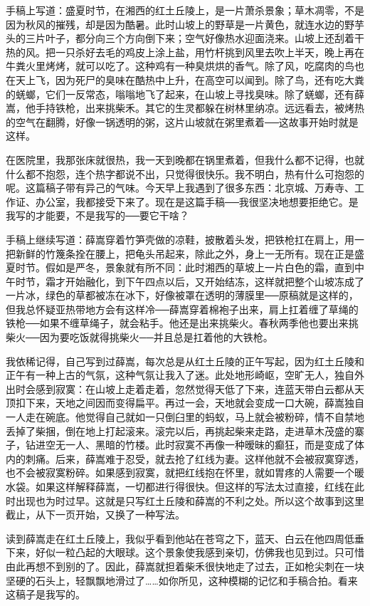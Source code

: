 手稿上写道：盛夏时节，在湘西的红土丘陵上，是一片萧杀景象；草木凋零，不是因为秋风的摧残，却是因为酷暑。此时山坡上的野草是一片黄色，就连水边的野芋头的三片叶子，都分向三个方向倒下来；空气好像热水迎面浇来。山坡上还刮着干热的风。把一只杀好去毛的鸡皮上涂上盐，用竹杆挑到风里去吹上半天，晚上再在牛粪火里烤烤，就可以吃了。这种鸡有一种臭烘烘的香气。除了风，吃腐肉的鸟也在天上飞，因为死尸的臭味在酷热中上升，在高空可以闻到。除了鸟，还有吃大粪的蜣螂，它们一反常态，嗡嗡地飞了起来，在山坡上寻找臭味。除了蜣螂，还有薛嵩，他手持铁枪，出来挑柴禾。其它的生灵都躲在树林里纳凉。远远看去，被烤热的空气在翻腾，好像一锅透明的粥，这片山坡就在粥里煮着──这故事开始时就是这样。 

在医院里，我那张床就很热，我一天到晚都在锅里煮着，但我什么都不记得，也就什么都不抱怨，连个热字都说不出，只觉得很快乐。我不明白，热有什么可抱怨的呢。这篇稿子带有异己的气味。今天早上我遇到了很多东西：北京城、万寿寺、工作证、办公室，我都接受下来了。现在是这篇手稿──我很坚决地想要拒绝它。是我写的才能要，不是我写的──要它干啥？ 

手稿上继续写道：薛嵩穿着竹笋壳做的凉鞋，披散着头发，把铁枪扛在肩上，用一把新鲜的竹篾条拴在腰上，把龟头吊起来，除此之外，身上一无所有。现在正是盛夏时节。假如是严冬，景象就有所不同：此时湘西的草坡上一片白色的霜，直到中午时节，霜才开始融化，到下午四点以后，又开始结冻，这样就把整个山坡冻成了一片冰，绿色的草都被冻在冰下，好像被罩在透明的薄膜里──原稿就是这样的，但我总怀疑亚热带地方会有这样冷──薛嵩穿着棉袍子出来，肩上扛着缠了草绳的铁枪──如果不缠草绳子，就会粘手。他还是出来挑柴火。春秋两季他也要出来挑柴火──因为要吃饭就得挑柴火──并且总是扛着他的大铁枪。 

我依稀记得，自己写到过薛嵩，每次总是从红土丘陵的正午写起，因为红土丘陵和正午有一种上古的气氛，这种气氛让我入了迷。此处地形崎岖，空旷无人，独自外出时会感到寂寞：在山坡上走着走着，忽然觉得天低了下来，连蓝天带白云都从天顶扣下来，天地之间因而变得扁平。再过一会，天地就会变成一口大碗，薛嵩独自一人走在碗底。他觉得自己就如一只倒臼里的蚂蚁，马上就会被粉碎，情不自禁地丢掉了柴捆，倒在地上打起滚来。滚完以后，再挑起柴来走路，走进草木茂盛的寨子，钻进空无一人、黑暗的竹楼。此时寂寞不再像一种暧昧的癫狂，而是变成了体内的刺痛。后来，薛嵩难于忍受，就去抢了红线为妻。这样他就不会被寂寞穿透，也不会被寂寞粉碎。如果感到寂寞，就把红线抱在怀里，就如胃疼的人需要一个暖水袋。如果这样解释薛嵩，一切都进行得很快。但这样的写法太过直接，红线在此时出现也为时过早。这就是只写红土丘陵和薛嵩的不利之处。所以这个故事到这里截止，从下一页开始，又换了一种写法。 

读到薛嵩走在红土丘陵上，我似乎看到他站在苍穹之下，蓝天、白云在他四周低垂下来，好似一粒凸起的大眼球。这个景象使我感到亲切，仿佛我也见到过。只可惜由此再想不到别的了。因此，薛嵩就担着柴禾很快地走了过去，正如枪尖刺在一块坚硬的石头上，轻飘飘地滑过了……如你所见，这种模糊的记忆和手稿合拍。看来这稿子是我写的。 

